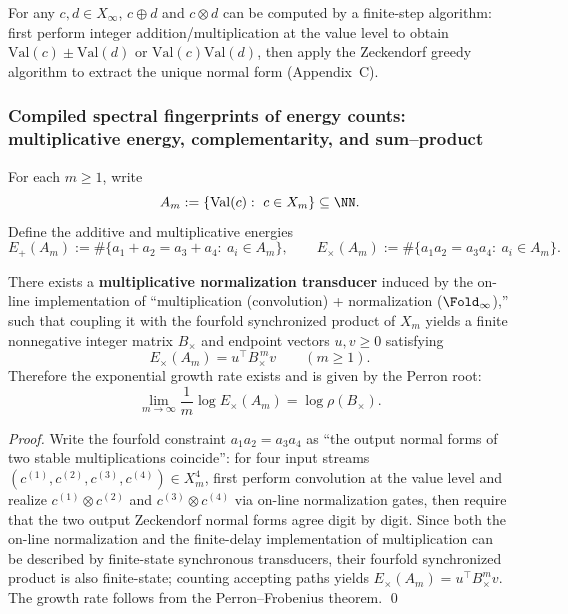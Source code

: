 \begin{proposition}\label{prop:zeckendorf-arith-computable}
For any $c,d\in X_\infty$, $c\oplus d$ and $c\otimes d$ can be computed by a finite-step algorithm: first perform integer addition/multiplication at the value level to obtain $\mathrm{Val}(c)\pm\mathrm{Val}(d)$ or $\mathrm{Val}(c)\mathrm{Val}(d)$, then apply the Zeckendorf greedy algorithm to extract the unique normal form (Appendix~C).
\end{proposition}

\subsubsection{Compiled spectral fingerprints of energy counts: multiplicative energy, complementarity, and sum--product}\label{subsec:energy-compiled-sumproduct}

For each \(m\ge 1\), write
\[
A_m:=\{\mathrm{Val}(c):\ c\in X_m\}\subseteq\NN.
\]
Define the additive and multiplicative energies
\[
E_{+}(A_m):=\#\{a_1+a_2=a_3+a_4:\ a_i\in A_m\},\qquad
E_{\times}(A_m):=\#\{a_1a_2=a_3a_4:\ a_i\in A_m\}.
\]

\begin{proposition}\label{prop:conclusion71-multiplicative-energy-compilable}
There exists a \textbf{multiplicative normalization transducer} induced by the on-line implementation of ``multiplication (convolution) + normalization (\(\Fold_\infty\)),''
such that coupling it with the fourfold synchronized product of \(X_m\) yields a finite nonneg\-ative integer matrix \(B_{\times}\) and endpoint vectors \(u,v\ge 0\) satisfying
\[
\boxed{\;
E_{\times}(A_m)=u^\top B_{\times}^{\,m}v\qquad(m\ge 1).\;}
\]
Therefore the exponential growth rate exists and is given by the Perron root:
\[
\lim_{m\to\infty}\frac{1}{m}\log E_{\times}(A_m)=\log\rho(B_{\times}).
\]
\end{proposition}

\begin{proof}
Write the fourfold constraint \(a_1a_2=a_3a_4\) as ``the output normal forms of two stable multiplications coincide'':
for four input streams \((c^{(1)},c^{(2)},c^{(3)},c^{(4)})\in X_m^4\),
first perform convolution at the value level and realize \(c^{(1)}\otimes c^{(2)}\) and \(c^{(3)}\otimes c^{(4)}\) via on-line normalization gates, then require that the two output Zeckendorf normal forms agree digit by digit.
Since both the on-line normalization and the finite-delay implementation of multiplication can be described by finite-state synchronous transducers, their fourfold synchronized product is also finite-state;
counting accepting paths yields \(E_\times(A_m)=u^\top B_\times^m v\).
The growth rate follows from the Perron--Frobenius theorem. \qed
\end{proof}

